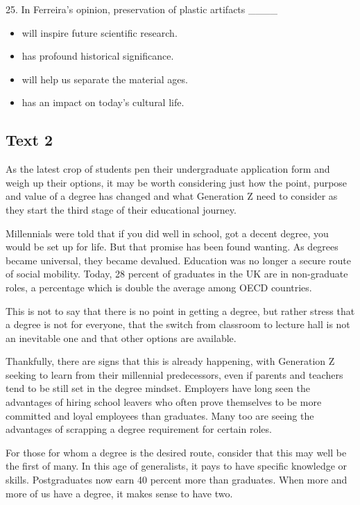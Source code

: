 \documentclass[UTF8,11pt]{ctexart}
\begin{document}
25. In Ferreira’s opinion, preservation of plastic artifacts \_\_\_\_


\begin{itemize}[leftmargin=2em,itemsep=.2em,topsep=.4em]\item[A.] will inspire future scientific research.
\item[B.] has profound historical significance.
\item[C.] will help us separate the material ages.
\item[D.] has an impact on today’s cultural life.
\end{itemize}

\subsection*{\textbf{Text 2}}


As the latest crop of students pen their undergraduate application form and weigh up their options, it may be worth considering just how the point, purpose and value of a degree has changed and what Generation Z need to consider as they start the third stage of their educational journey.


Millennials were told that if you did well in school, got a decent degree, you would be set up for life. But that promise has been found wanting. As degrees became universal, they became devalued. Education was no longer a secure route of social mobility. Today, 28 percent of graduates in the UK are in non-graduate roles, a percentage which is double the average among OECD countries.


This is not to say that there is no point in getting a degree, but rather stress that a degree is not for everyone, that the switch from classroom to lecture hall is not an inevitable one and that other options are available.


Thankfully, there are signs that this is already happening, with Generation Z seeking to learn from their millennial predecessors, even if parents and teachers tend to be still set in the degree mindset. Employers have long seen the advantages of hiring school leavers who often prove themselves to be more committed and loyal employees than graduates. Many too are seeing the advantages of scrapping a degree requirement for certain roles.


For those for whom a degree is the desired route, consider that this may well be the first of many. In this age of generalists, it pays to have specific knowledge or skills. Postgraduates now earn 40 percent more than graduates. When more and more of us have a degree, it makes sense to have two.
\end{document}
